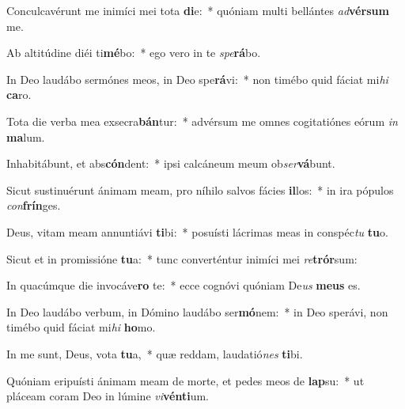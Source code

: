 \item Conculcavérunt me inimíci mei tota \textbf{di}e:~* quóniam multi bellántes \textit{ad}\textbf{vér}\textbf{sum} me.
\item Ab altitúdine diéi ti\textbf{mé}bo:~* ego vero in te \textit{spe}\textbf{rá}bo.
\item In Deo laudábo sermónes meos, in Deo spe\textbf{rá}vi:~* non timébo quid fáciat mi\textit{hi} \textbf{ca}ro.
\item Tota die verba mea exsecra\textbf{bán}tur:~* advérsum me omnes cogitatiónes eórum \textit{in} \textbf{ma}lum.
\item Inhabitábunt, et abs\textbf{cón}dent:~* ipsi calcáneum meum ob\textit{ser}\textbf{vá}bunt.
\item Sicut sustinuérunt ánimam meam, pro níhilo salvos fácies \textbf{il}los:~* in ira pópulos \textit{con}\textbf{frín}ges.
\item Deus, vitam meam annuntiávi \textbf{ti}bi:~* posuísti lácrimas meas in conspéc\textit{tu} \textbf{tu}o.
\item Sicut et in promissióne \textbf{tu}a:~* tunc converténtur inimíci mei \textit{re}\textbf{trór}sum:
\item In quacúmque die invocáve\textbf{ro} te:~* ecce cognóvi quóniam De\textit{us} \textbf{me}\textbf{us} es.
\item In Deo laudábo verbum, in Dómino laudábo ser\textbf{mó}nem:~* in Deo sperávi, non timébo quid fáciat mi\textit{hi} \textbf{ho}mo.
\item In me sunt, Deus, vota \textbf{tu}a,~* quæ reddam, laudatió\textit{nes} \textbf{ti}bi.
\item Quóniam eripuísti ánimam meam de morte, et pedes meos de \textbf{lap}su:~* ut pláceam coram Deo in lúmine \textit{vi}\textbf{vén}\textbf{ti}um.
